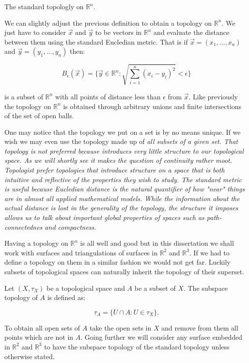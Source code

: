 \begin{ex} The standard topologly on $\mathbb{R}^n$.  \end{ex}

We can slightly adjust the previous definition to obtain a topology on $\mathbb{R}^n$. We just have to consider $\vec{x} \text{ and } \vec{y}$ to be vectors in $\mathbb{R}^n$ and evaluate the distance between them using the standard Eucledian metric. That is if $\vec{x} = (x_1, ..., x_n)$ and $\vec{y} = (y_1, ..., y_n)$ then:

$$ B_\epsilon(\vec{x}) = \{\vec{y} \in \mathbb{R}^n : \sqrt{\sum_{i = 1}^{n}{(x_i - y_i) ^ 2}} < \epsilon \} $$

is a subset of $\mathbb{R}^n$ with all points of distance less than $\epsilon$ from $\vec{x}$. Like previously the topology on $\mathbb{R}^n$ is obtained through arbitrary unions and finite intersections of the set of open balls.


One may notice that the topology we put on a set is by no means unique. If we wish we may even use the topology made up of \em all \em subsets of a given set. That topology is not preferred because introduces very little structure to our topological space. As we will shortly see it makes the question of continuity rather moot. Topologist prefer topologies that introduce structure on a space that is both intuitive and reflective of the properties they wish to study. The standard metric is useful because Eucledian distance is the natural quantifier of how "near" things are in almost all applied mathematical models. While the information about the actual distance is lost in the generality of the topology, the structure it imposes allows us to talk about important global properties of spaces such as path-connectednes and compactness.

Having a topology on $\mathbb{R}^n$ is all well and good but in this dissertation we shall work with surfaces and triangulations of surfaces in $\mathbb{R}^2$ and $\mathbb{R}^3$. If we had to define a topology on them in a similar fashion we would not get far. Luckily subsets of topological spaces can naturally inherit the topology of their superset.

\begin{defn} Let $(X, \tau_X)$ be a topological space and $A$ be a subset of $X$. The subspace topology of $A$ is defined as: \end{defn}

$$ \tau_A = \{U \cap A: U \in \tau_X\}.$$

To obtain all open sets of $A$ take the open sets in $X$ and remove from them all points which are not in $A$. Going further we will consider any surface embedded in $\mathbb{R}^2$ and $\mathbb{R}^3$ to have the subspace topology of the standard topology unless otherwise stated.

